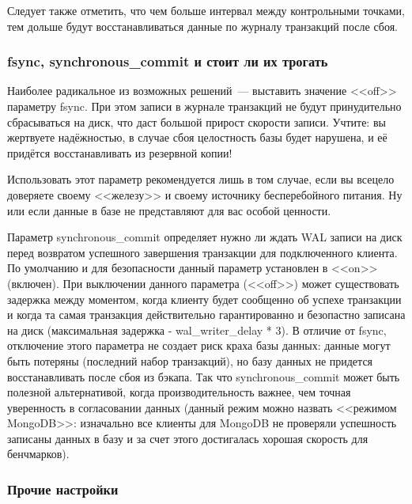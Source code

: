 Следует также отметить, что чем больше интервал между контрольными точками, тем дольше будут восстанавливаться данные по журналу транзакций после сбоя.

\subsubsection{fsync, synchronous\_commit и стоит ли их трогать}

Наиболее радикальное из возможных решений~--- выставить значение <<off>> параметру fsync. При этом записи в журнале транзакций не будут принудительно сбрасываться на диск, что даст большой прирост скорости записи. Учтите: вы жертвуете надёжностью, в случае сбоя целостность базы будет нарушена, и её придётся восстанавливать из резервной копии!

Использовать этот параметр рекомендуется лишь в том случае, если вы всецело доверяете своему <<железу>> и своему источнику бесперебойного питания. Ну или если данные в базе не представляют для вас особой ценности.

Параметр synchronous\_commit определяет нужно ли ждать WAL записи на диск перед возвратом успешного завершения транзакции для подключенного клиента. По умолчанию и для безопасности данный параметр установлен в <<on>> (включен). При выключении данного параметра (<<off>>) может существовать задержка между моментом, когда клиенту будет сообщенно об успехе транзакции и когда та самая транзакция действительно гарантированно и безопастно записана на диск (максимальная задержка - wal\_writer\_delay * 3). В отличие от fsync, отключение этого параметра не создает риск краха базы данных: данные могут быть потеряны (последний набор транзакций), но базу данных не придется восстанавливать после сбоя из бэкапа. Так что synchronous\_commit может быть полезной альтернативой, когда производительность важнее, чем точная уверенность в согласовании данных (данный режим можно назвать <<режимом MongoDB>>: изначально все клиенты для MongoDB не проверяли успешность записаны данных в базу и за счет этого достигалась хорошая скорость для бенчмарков).

\subsubsection{Прочие настройки}

